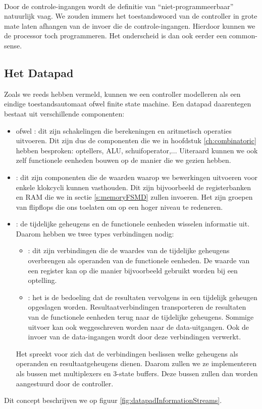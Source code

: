 \paragraph{}
Door de controle-ingangen wordt de definitie van ``niet-programmeerbaar'' natuurlijk vaag. We zouden immers het toestandswoord van de controller in grote mate laten afhangen van de invoer die de controle-ingangen. Hierdoor kunnen we de processor toch programmeren. Het onderscheid is dan ook eerder een common-sense.
\subsection{Het Datapad}
Zoals we reeds hebben vermeld, kunnen we een controller modelleren als een eindige toestandsautomaat ofwel finite state machine. Een datapad daarentegen bestaat uit verschillende componenten:
\begin{itemize}
 \item {} ofwel : dit zijn schakelingen die berekeningen en aritmetisch operaties uitvoeren. Dit zijn dus de componenten die we in hoofdstuk \ref{ch:combinatoric} hebben besproken: optellers, ALU, schuifoperator,... Uiteraard kunnen we ook zelf functionele eenheden bouwen op de manier die we gezien hebben.
 \item {}: dit zijn componenten die de waarden waarop we bewerkingen uitvoeren voor enkele klokcycli kunnen vasthouden. Dit zijn bijvoorbeeld de registerbanken en RAM die we in sectie \ref{s:memoryFSMD} zullen invoeren. Het zijn groepen van flipflops die ons toelaten om op een hoger niveau te redeneren.
 \item {}: de tijdelijke geheugens en de functionele eenheden wisselen informatie uit. Daarom hebben we twee types verbindingen nodig:
 \begin{itemize}
  \item {}: dit zijn verbindingen die de waardes van de tijdelijke geheugens overbrengen als operanden van de functionele eenheden. De waarde van een register kan op die manier bijvoorbeeld gebruikt worden bij een optelling.
  \item {}: het is de bedoeling dat de resultaten vervolgens in een tijdelijk geheugen opgeslagen worden. Resultaatverbindingen transporteren de resultaten van de functionele eenheden terug naar de tijdelijke geheugens. Sommige uitvoer kan ook weggeschreven worden naar de data-uitgangen. Ook de invoer van de data-ingangen wordt door deze verbindingen verwerkt.
 \end{itemize}
 Het spreekt voor zich dat de verbindingen beslissen welke geheugens als operanden en resultaatgeheugens dienen. Daarom zullen we ze implementeren als bussen met multiplexers en 3-state buffers. Deze bussen zullen dan worden aangestuurd door de controller.
\end{itemize}
Dit concept beschrijven we op figuur \ref{fig:datapadInformationStreams}.
